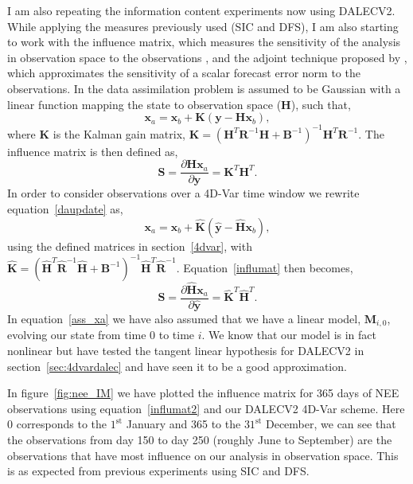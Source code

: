 \documentclass[11pt]{article}
\begin{document}
I am also repeating the information content experiments now using DALECV2. While applying the measures previously used (SIC and DFS), I am also starting to work with the influence matrix, which measures the sensitivity of the analysis in observation space to the observations \citep{Cardinali2004}, and the adjoint technique proposed by \cite{Langland2004}, which approximates the sensitivity of a scalar forecast error norm to the observations. In \cite{Cardinali2004} the data assimilation problem is assumed to be Gaussian with a linear function mapping the state to observation space (\textbf{H}), such that,
\begin{equation}
\textbf{x}_{a} = \textbf{x}_{b} + \textbf{K}(\textbf{y} - \textbf{H}\textbf{x}_{b}), \label{daupdate}
\end{equation}
where \textbf{K} is the Kalman gain matrix, $\textbf{K} = (\textbf{H}^{T}\textbf{R}^{-1}\textbf{H} + \textbf{B}^{-1})^{-1}\textbf{H}^{T}\textbf{R}^{-1}$. The influence matrix is then defined as,
\begin{equation}
\textbf{S} = \frac{\partial {\mathbf{H}}\textbf{x}_a}{\partial {\textbf{y}}} = \textbf{K}^{T}\textbf{H}^{T}. \label{influmat}
\end{equation}
In order to consider observations over a 4D-Var time window we rewrite equation~\ref{daupdate} as,
\begin{equation}
\textbf{x}_{a} = \textbf{x}_{b} + \hat{\textbf{K}}(\hat{\textbf{y}} - \hat{\textbf{H}}\textbf{x}_{b}), \label{ass_xa}
\end{equation}
using the defined matrices in section~\ref{4dvar}, with $\hat{\textbf{K}} = (\hat{\textbf{H}}^{T}\hat{\textbf{R}}^{-1}\hat{\textbf{H}} + \textbf{B}^{-1})^{-1}\hat{\textbf{H}}^{T}\hat{\textbf{R}}^{-1}$. Equation~\ref{influmat} then becomes,
\begin{equation}
\textbf{S} = \frac{\partial {\hat{\mathbf{H}}}\textbf{x}_a}{\partial \hat{{\textbf{y}}}} = \hat{\textbf{K}}^{T}\hat{\textbf{H}}^{T}. \label{influmat2}
\end{equation}
In equation~\ref{ass_xa} we have also assumed that we have a linear model, $\mathbf{M}_{i,0}$, evolving our state from time 0 to time $i$. We know that our model is in fact nonlinear but have tested the tangent linear hypothesis for DALECV2 in section~\ref{sec:4dvardalec} and have seen it to be a good approximation. 

In figure~\ref{fig:nee_IM} we have plotted the influence matrix for 365 days of NEE observations using equation~\ref{influmat2} and our DALECV2 4D-Var scheme. Here 0 corresponds to the $1^{\text{st}}$ January and 365 to the $31^{\text{st}}$ December, we can see that the observations from day 150 to day 250 (roughly June to September) are the observations that have most influence on our analysis in observation space. This is as expected from previous experiments using SIC and DFS. 
\end{document}
